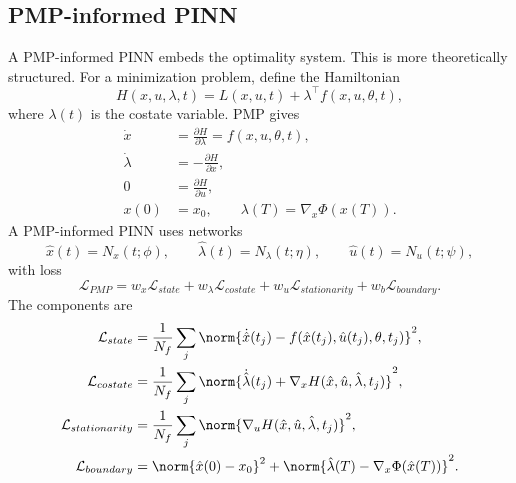 \documentclass[11pt,a4paper]{article}
\begin{document}
\subsection{PMP-informed PINN}
A PMP-informed PINN embeds the optimality system. This is more theoretically structured. For a minimization problem, define the Hamiltonian
\begin{equation}
    H(x,u,\lambda,t)=L(x,u,t)+\lambda^\top f(x,u,\theta,t),
\end{equation}
where $\lambda(t)$ is the costate variable. PMP gives
\begin{align}
    \dot{x} &= \frac{\partial H}{\partial \lambda}=f(x,u,\theta,t),\\
    \dot{\lambda} &= -\frac{\partial H}{\partial x},\\
    0 &= \frac{\partial H}{\partial u},\\
    x(0)&=x_0, \qquad \lambda(T)=\nabla_x\Phi(x(T)).
\end{align}
A PMP-informed PINN uses networks
\begin{equation}
    \hat{x}(t)=N_x(t;\phi),\qquad \hat{\lambda}(t)=N_\lambda(t;\eta),\qquad \hat{u}(t)=N_u(t;\psi),
\end{equation}
with loss
\begin{equation}
    \mathcal{L}_{PMP}=w_x\mathcal{L}_{state}+w_\lambda\mathcal{L}_{costate}+w_u\mathcal{L}_{stationarity}+w_b\mathcal{L}_{boundary}.
\end{equation}
The components are
\begin{align}
    \mathcal{L}_{state} &= \frac{1}{N_f}\sum_j\norm{\dot{\hat{x}}(t_j)-f(\hat{x}(t_j),\hat{u}(t_j),\theta,t_j)}^2,\\
    \mathcal{L}_{costate} &= \frac{1}{N_f}\sum_j\norm{\dot{\hat{\lambda}}(t_j)+\nabla_xH(\hat{x},\hat{u},\hat{\lambda},t_j)}^2,\\
    \mathcal{L}_{stationarity} &= \frac{1}{N_f}\sum_j\norm{\nabla_uH(\hat{x},\hat{u},\hat{\lambda},t_j)}^2,\\
    \mathcal{L}_{boundary} &= \norm{\hat{x}(0)-x_0}^2+\norm{\hat{\lambda}(T)-\nabla_x\Phi(\hat{x}(T))}^2.
\end{align}
\end{document}
